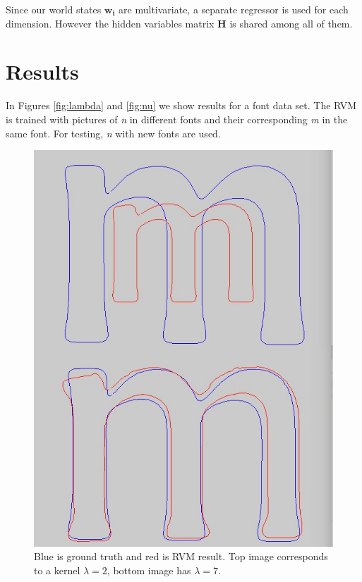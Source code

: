\documentclass[12pt]{article}
\begin{document}
Since our world states $\mathbf{w_i}$ are multivariate, a separate regressor is used for each dimension.
However the hidden variables matrix $\mathbf{H}$ is shared among all of them.

\section{Results}

In Figures \ref{fig:lambda} and \ref{fig:nu} we show results for a font data set.
The RVM is trained with pictures of \emph{n} in different fonts and their corresponding \emph{m} in the same font.
For testing, \emph{n} with new fonts are used.

\begin{figure}[h]
	\centering
	\begin{minipage}[t]{.45\textwidth}
		\centering
		\includegraphics[scale=0.25]{images/lambda2_7}
		\caption{Blue is ground truth and red is RVM result. Top image corresponds to a kernel $\lambda=2$, bottom image has $\lambda=7$.}

\end{minipage}
\end{figure}
\end{document}
